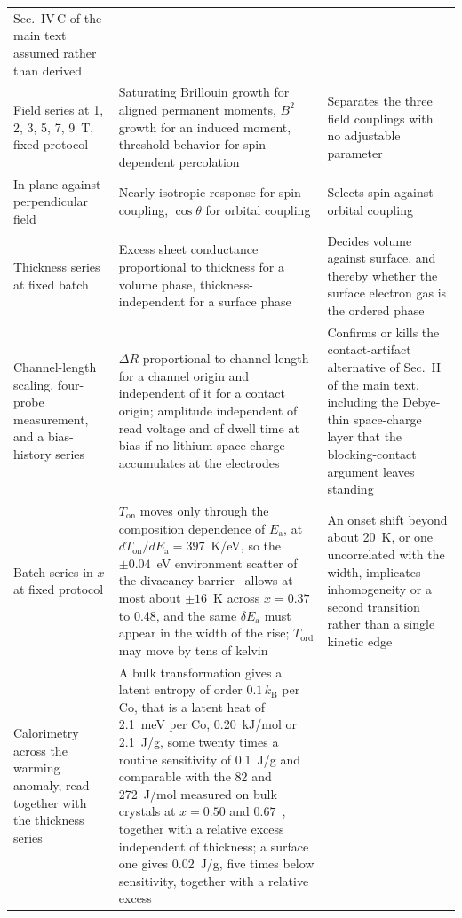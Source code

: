 \documentclass[reprint,twocolumn,prb,amsmath,amssymb,superscriptaddress,floatfix]{revtex4-2}
\newcommand{\kB}{k_{\mathrm{B}}}
\newcommand{\Ea}{E_{\mathrm{a}}}
\newcommand{\Ton}{T_{\mathrm{on}}}
\newcommand{\Tcol}{T_{\mathrm{ord}}}
\begin{document}
\begin{table}[t]
\begin{ruledtabular}
\begin{tabular}{p{}p{}p{}}
    Sec.~IV\,C of the main text assumed rather than derived \\
    Field series at 1, 2, 3, 5, 7, 9~T, fixed protocol &
    Saturating Brillouin growth for aligned permanent moments, $B^{2}$ growth for an induced
    moment, threshold behavior for spin-dependent percolation &
    Separates the three field couplings with no adjustable parameter \\
    In-plane against perpendicular field &
    Nearly isotropic response for spin coupling, $\cos\theta$ for orbital coupling &
    Selects spin against orbital coupling \\
    Thickness series at fixed batch &
    Excess sheet conductance proportional to thickness for a volume phase,
    thickness-independent for a surface phase &
    Decides volume against surface, and thereby whether the surface electron gas is the
    ordered phase \\
    Channel-length scaling, four-probe measurement, and a bias-history series &
    $\Delta R$ proportional to channel length for a channel origin and independent of it for a
    contact origin; amplitude independent of read voltage and of dwell time at bias if no lithium
    space charge accumulates at the electrodes &
    Confirms or kills the contact-artifact alternative of Sec.~II of the main text, including
    the Debye-thin space-charge layer that the blocking-contact argument leaves standing \\
    Batch series in $x$ at fixed protocol &
    $\Ton$ moves only through the composition dependence of $\Ea$, at $d\Ton/d\Ea=397$~K/eV, so
    the $\pm0.04$~eV environment scatter of the divacancy barrier~\cite{VanderVen2001b} allows at
    most about $\pm16$~K across $x=0.37$ to 0.48, and the same $\delta\Ea$ must appear in the
    width of the rise; $\Tcol$ may move by tens of kelvin &
    An onset shift beyond about 20~K, or one uncorrelated with the width, implicates
    inhomogeneity or a second transition rather than a single kinetic edge \\
    Calorimetry across the warming anomaly, read together with the thickness series &
    A bulk transformation gives a latent entropy of order $0.1\,\kB$ per Co, that is a latent
    heat of 2.1~meV per Co, 0.20~kJ/mol or 2.1~J/g, some twenty times a routine sensitivity of
    0.1~J/g and comparable with the 82 and 272~J/mol measured on bulk crystals at $x=0.50$ and
    $0.67$~\cite{Motohashi2009}, together with a relative excess independent of thickness; a
    surface one gives 0.02~J/g, five times below sensitivity, together with a relative excess

\end{tabular}
\end{ruledtabular}
\end{table}
\end{document}
